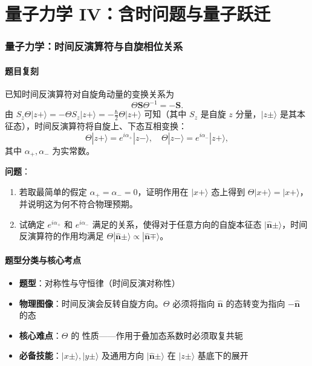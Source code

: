 \part{量子力学 IV：含时问题与量子跃迁}\label{part:qm4}\setpartcolor{\value{part}}

\newpage
\section[量子力学：时间反演算符与自旋相位关系]{量子力学：时间反演算符与自旋相位关系}

\subsection{题目复刻}

\begin{modelbox}
已知时间反演算符对自旋角动量的变换关系为
\[
\Theta \bm{S} \Theta^{-1} = -\bm{S}.
\]
由 $S_z \Theta |z+\rangle = -\Theta S_z |z+\rangle = -\frac{\hbar}{2} \Theta |z+\rangle$ 可知（其中 $S_z$ 是自旋 $z$ 分量，$|z\pm\rangle$ 是其本征态），时间反演算符将自旋上、下态互相变换：
\[
\Theta |z+\rangle = e^{i\alpha_+} |z-\rangle, \quad \Theta |z-\rangle = e^{i\alpha_-} |z+\rangle,
\]
其中 $\alpha_+, \alpha_-$ 为实常数。

\textbf{问题}：
\begin{enumerate}[nosep]
    \item 若取最简单的假定 $\alpha_+ = \alpha_- = 0$，证明作用在 $|x+\rangle$ 态上得到 $\Theta |x+\rangle = |x+\rangle$，并说明这为何不符合物理预期。
    \item 试确定 $e^{i\alpha_+}$ 和 $e^{i\alpha_-}$ 满足的关系，使得对于任意方向的自旋本征态 $|\hat{\bm{n}}\pm\rangle$，时间反演算符的作用均满足 $\Theta |\hat{\bm{n}}\pm\rangle \propto |\hat{\bm{n}}\mp\rangle$。
\end{enumerate}
\end{modelbox}

\subsection{题型分类与核心考点}

\begin{insightbox}[核心考点]
\begin{itemize}[nosep]
    \item \textbf{题型}：对称性与守恒律（时间反演对称性）
    \item \textbf{物理图像}：时间反演会反转自旋方向。$\Theta$ 必须将指向 $\hat{\bm{n}}$ 的态转变为指向 $-\hat{\bm{n}}$ 的态
    \item \textbf{核心难点}：$\Theta$ 的  性质——作用于叠加态系数时必须取复共轭
    \item \textbf{必备技能}：$|x\pm\rangle, |y\pm\rangle$ 及通用方向 $|\hat{\bm{n}}\pm\rangle$ 在 $|z\pm\rangle$ 基底下的展开
\end{itemize}
\end{insightbox}

